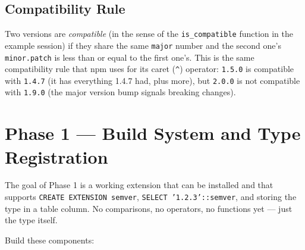 \documentclass[11pt,a4paper]{article}
\begin{document}
\subsection{Compatibility Rule}
Two versions are \textit{compatible} (in the sense of the \texttt{is\_compatible} function in the example session) if they share the same \texttt{major} number and the second one's \texttt{minor.patch} is less than or equal to the first one's. This is the same compatibility rule that npm uses for its caret (\texttt{\textasciicircum}) operator: \texttt{1.5.0} is compatible with \texttt{1.4.7} (it has everything 1.4.7 had, plus more), but \texttt{2.0.0} is not compatible with \texttt{1.9.0} (the major version bump signals breaking changes).

\section{Phase 1 --- Build System and Type Registration}

The goal of Phase 1 is a working extension that can be installed and that supports \texttt{CREATE EXTENSION semver}, \texttt{SELECT '1.2.3'::semver}, and storing the type in a table column. No comparisons, no operators, no functions yet --- just the type itself.

Build these components:
\end{document}
